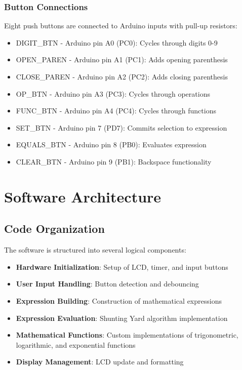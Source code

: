 \documentclass[12pt,a4paper]{article}
\begin{document}
\subsubsection{Button Connections}
Eight push buttons are connected to Arduino inputs with pull-up resistors:
\begin{itemize}
    \item DIGIT\_BTN - Arduino pin A0 (PC0): Cycles through digits 0-9
    \item OPEN\_PAREN - Arduino pin A1 (PC1): Adds opening parenthesis
    \item CLOSE\_PAREN - Arduino pin A2 (PC2): Adds closing parenthesis
    \item OP\_BTN - Arduino pin A3 (PC3): Cycles through operations
    \item FUNC\_BTN - Arduino pin A4 (PC4): Cycles through functions
    \item SET\_BTN - Arduino pin 7 (PD7): Commits selection to expression
    \item EQUALS\_BTN - Arduino pin 8 (PB0): Evaluates expression
    \item CLEAR\_BTN - Arduino pin 9 (PB1): Backspace functionality
\end{itemize}

\section{Software Architecture}

\subsection{Code Organization}

The software is structured into several logical components:

\begin{itemize}
    \item \textbf{Hardware Initialization}: Setup of LCD, timer, and input buttons
    \item \textbf{User Input Handling}: Button detection and debouncing
    \item \textbf{Expression Building}: Construction of mathematical expressions
    \item \textbf{Expression Evaluation}: Shunting Yard algorithm implementation
    \item \textbf{Mathematical Functions}: Custom implementations of trigonometric, logarithmic, and exponential functions
    \item \textbf{Display Management}: LCD update and formatting
\end{itemize}
\end{document}
